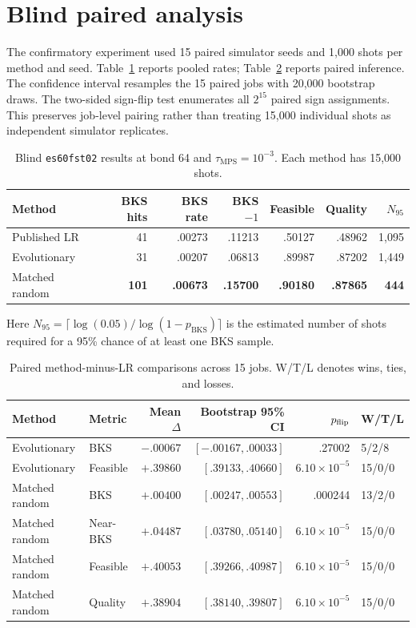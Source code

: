 \documentclass[10pt]{article}
\newcommand{\BKS}{\mathrm{BKS}}
\newcommand{\tauMPS}{\tau_{\mathrm{MPS}}}
\begin{document}
\section{Blind paired analysis}

The confirmatory experiment used 15 paired simulator seeds and 1,000 shots per
method and seed. Table~\ref{tab:blind} reports pooled rates; Table~\ref{tab:paired}
reports paired inference. The confidence interval resamples the 15 paired jobs
with 20,000 bootstrap draws. The two-sided sign-flip test enumerates all
$2^{15}$ paired sign assignments. This preserves job-level pairing rather than
treating 15,000 individual shots as independent simulator replicates.

\begin{table}[h]
\centering
\caption{Blind \texttt{es60fst02} results at bond 64 and
$\tauMPS=10^{-3}$. Each method has 15,000 shots.}
\label{tab:blind}
\begin{tabular}{lrrrrrr}
\toprule
Method & BKS hits & BKS rate & BKS$-1$ & Feasible & Quality & $N_{95}$ \\
\midrule
Published LR & 41 & .00273 & .11213 & .50127 & .48962 & 1,095 \\
Evolutionary & 31 & .00207 & .06813 & .89987 & .87202 & 1,449 \\
Matched random & \textbf{101} & \textbf{.00673} & \textbf{.15700} & \textbf{.90180} & \textbf{.87865} & \textbf{444} \\
\bottomrule
\end{tabular}
\end{table}

Here $N_{95}=\lceil\log(0.05)/\log(1-p_{\BKS})\rceil$ is the estimated number
of shots required for a 95\% chance of at least one BKS sample.

\begin{table}[h]
\centering
\caption{Paired method-minus-LR comparisons across 15 jobs. W/T/L denotes
wins, ties, and losses.}
\label{tab:paired}
\begin{tabular}{llrrrl}
\toprule
Method & Metric & Mean $\Delta$ & Bootstrap 95\% CI & $p_{\rm flip}$ & W/T/L \\
\midrule
Evolutionary & BKS & $-.00067$ & $[-.00167,.00033]$ & .27002 & 5/2/8 \\
Evolutionary & Feasible & $+.39860$ & $[.39133,.40660]$ & $6.10\!\times\!10^{-5}$ & 15/0/0 \\
Matched random & BKS & $+.00400$ & $[.00247,.00553]$ & .000244 & 13/2/0 \\
Matched random & Near-BKS & $+.04487$ & $[.03780,.05140]$ & $6.10\!\times\!10^{-5}$ & 15/0/0 \\
Matched random & Feasible & $+.40053$ & $[.39266,.40987]$ & $6.10\!\times\!10^{-5}$ & 15/0/0 \\
Matched random & Quality & $+.38904$ & $[.38140,.39807]$ & $6.10\!\times\!10^{-5}$ & 15/0/0 \\
\bottomrule
\end{tabular}
\end{table}
\end{document}
